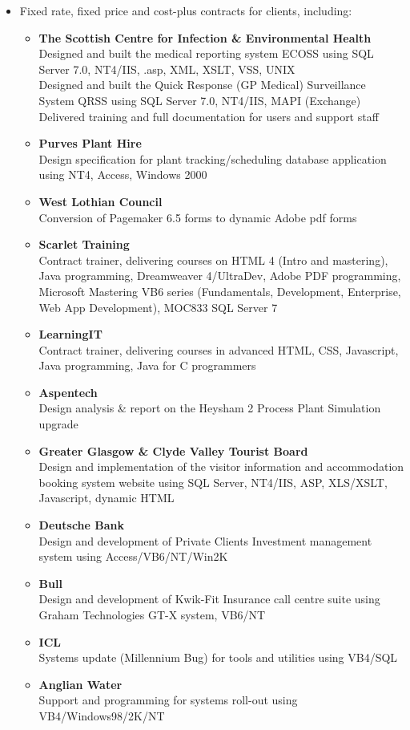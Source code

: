 \documentclass[10pt]{article}
\newenvironment{outerlist}[1][\enskip\textbullet]%
        {\begin{itemize}[#1]}{\end{itemize}%
         \vspace{-.6\baselineskip}}
\begin{document}
\begin{outerlist}
\item[] Fixed rate, fixed price and cost-plus contracts for clients, including:

\begin{outerlist}

\item \textbf{The Scottish Centre for Infection \& Environmental Health} \\ %
		Designed and built the medical reporting system ECOSS using SQL Server 7.0, NT4/IIS, .asp, XML, XSLT, VSS, UNIX\\
		Designed and built the Quick Response (GP Medical) Surveillance System QRSS using SQL Server 7.0, NT4/IIS, MAPI (Exchange)\\
		Delivered training and full documentation for users and support staff
\item \textbf{Purves Plant Hire} \\ %
	Design specification for plant tracking/scheduling database application using NT4, Access, Windows 2000
\item \textbf{West Lothian Council}\\ %
	Conversion of Pagemaker 6.5 forms to dynamic Adobe pdf forms 
\item \textbf{Scarlet Training} \\%
	Contract trainer, delivering courses on HTML 4 (Intro and mastering), Java programming, Dreamweaver 4/UltraDev, Adobe PDF programming, Microsoft Mastering VB6 series (Fundamentals, Development, Enterprise, Web App Development), MOC833 SQL Server 7
\item \textbf{LearningIT} \\ %
	Contract trainer, delivering courses in advanced HTML, CSS, Javascript, Java programming, Java for C programmers
\item \textbf{Aspentech} \\ %
	Design analysis \& report on the Heysham 2 Process Plant Simulation upgrade
\item \textbf{Greater Glasgow \& Clyde Valley Tourist Board} \\ %
	Design and implementation of the visitor information and accommodation booking system website using SQL Server, NT4/IIS, ASP, XLS/XSLT, Javascript, dynamic HTML
\item \textbf{Deutsche Bank} \\ %
	Design and development of Private Clients Investment management system using Access/VB6/NT/Win2K
\item \textbf{Bull} \\ %
	Design and development of Kwik-Fit Insurance call centre suite using Graham Technologies GT-X system, VB6/NT
\item \textbf{ICL} \\ %
	Systems update (Millennium Bug) for tools and utilities using VB4/SQL
\item \textbf{Anglian Water} \\ %
	Support and programming for systems roll-out using VB4/Windows98/2K/NT

\end{outerlist}
\end{outerlist}
\end{document}
